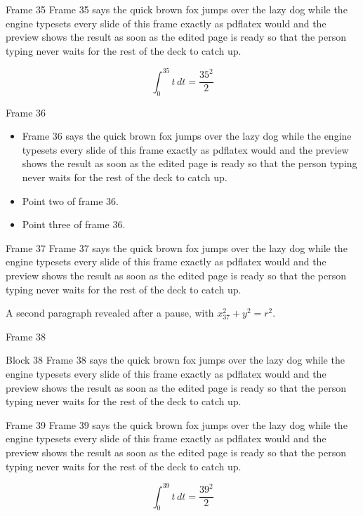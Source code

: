 \documentclass{beamer}
\begin{document}
\begin{frame}{Frame 35}
  Frame 35 says the quick brown fox jumps over the lazy dog while the engine typesets every slide of this frame exactly as pdflatex would and the preview shows the result as soon as the edited page is ready so that the person typing never waits for the rest of the deck to catch up.

  \[ \int_0^{35} t\,dt = \frac{35^2}{2} \]
\end{frame}
\begin{frame}{Frame 36}
  \begin{itemize}
    \item<1-> Frame 36 says the quick brown fox jumps over the lazy dog while the engine typesets every slide of this frame exactly as pdflatex would and the preview shows the result as soon as the edited page is ready so that the person typing never waits for the rest of the deck to catch up.
    \item<2-> Point two of frame 36.
    \item<3-> Point three of frame 36.
  \end{itemize}
\end{frame}
\begin{frame}{Frame 37}
  Frame 37 says the quick brown fox jumps over the lazy dog while the engine typesets every slide of this frame exactly as pdflatex would and the preview shows the result as soon as the edited page is ready so that the person typing never waits for the rest of the deck to catch up.
  \pause

  A second paragraph revealed after a pause, with $x_{37}^2 + y^2 = r^2$.
\end{frame}
\begin{frame}{Frame 38}
  \begin{block}{Block 38}
    Frame 38 says the quick brown fox jumps over the lazy dog while the engine typesets every slide of this frame exactly as pdflatex would and the preview shows the result as soon as the edited page is ready so that the person typing never waits for the rest of the deck to catch up.
  \end{block}
\end{frame}
\begin{frame}{Frame 39}
  Frame 39 says the quick brown fox jumps over the lazy dog while the engine typesets every slide of this frame exactly as pdflatex would and the preview shows the result as soon as the edited page is ready so that the person typing never waits for the rest of the deck to catch up.

  \[ \int_0^{39} t\,dt = \frac{39^2}{2} \]
\end{frame}
\end{document}
